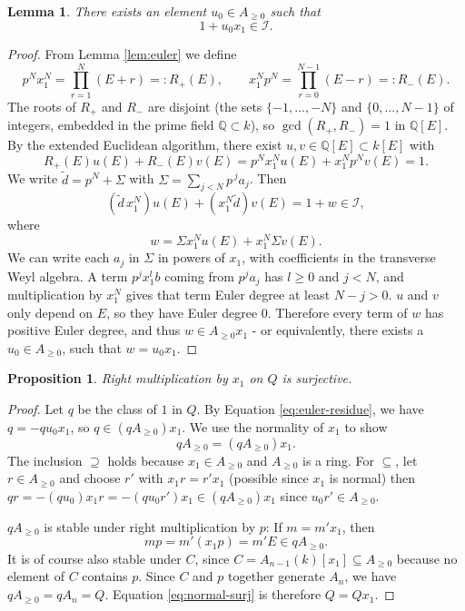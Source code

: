 \documentclass[pdflatex,sn-mathphys-num]{sn-jnl}
\numberwithin{equation}{section}
\theoremstyle{thmstyleone}
\newtheorem{proposition}[theorem]{Proposition}
\newtheorem{lemma}[theorem]{Lemma}
\theoremstyle{thmstyletwo}
\begin{document}
\begin{lemma}\label{lem:euler-residue}
There exists an element $u_0\in A_{\geq0}$ such that
\begin{equation} 1+u_0x_1\in \mathcal I.
 \label{eq:euler-residue}\end{equation}
\end{lemma}

\begin{proof}
From Lemma \ref{lem:euler} we define
\[p^Nx_1^N=\prod_{r=1}^N(E+r)=:R_+(E),\qquad
 x_1^Np^N=\prod_{r=0}^{N-1}(E-r)=:R_-(E).\]
The roots of $R_+$ and $R_-$ are disjoint (the sets $\{-1,\ldots,-N\}$ and $\{0,\ldots,N-1\}$ of integers, embedded in the prime field
$\mathbb Q\subset k$), so $\gcd(R_+,R_-)=1$ in $\mathbb Q[E]$. By the
extended Euclidean algorithm, there exist $u,v\in\mathbb Q[E]\subset
k[E]$ with
\[ R_+(E)u(E)+R_-(E)v(E)=p^Nx_1^Nu(E)+x_1^Np^Nv(E)=1.\]
We write $\tilde d=p^N+\Sigma$ with $\Sigma = \sum_{j<N}p^{\,j}a_j$. Then
\[(\tilde d\,x_1^N)u(E)+(x_1^N\tilde d)v(E)=1+w\in \mathcal I,\]
where
\[w=\Sigma x_1^Nu(E)+x_1^N\Sigma v(E).\]
We can write each $a_j$ in $\Sigma$ in powers of $x_1$, with coefficients in the transverse Weyl algebra. A term $p^jx_1^lb$ coming from $p^ja_j$ has $l\geq0$ and $j<N$, and multiplication by $x_1^N$ gives that term Euler degree at least $N-j>0$. $u$ and $v$ only depend on $E$, so they have Euler degree 0. Therefore every term of $w$ has positive Euler degree, and thus $w\in A_{\geq0}x_1$ - or equivalently, there exists a $u_0\in A_{\geq0}$, such that $w=u_0x_1$.
\end{proof}


\begin{proposition}\label{prop:x-surjective}
Right multiplication by $x_1$ on $Q$ is surjective.
\end{proposition}
\begin{proof}
Let $q$ be the class of $1$ in $Q$. By Equation \eqref{eq:euler-residue}, we have
$q=-qu_0x_1$, so $q\in(qA_{\geq0})x_1$. We use the normality of $x_1$ to show
\begin{equation} qA_{\geq0}=(qA_{\geq0})x_1.
 \label{eq:normal-surj}\end{equation}
The inclusion $\supseteq$ holds because $x_1\in A_{\geq0}$ and
$A_{\geq0}$ is a ring. For $\subseteq$, let $r\in A_{\geq0}$ and choose
$r'$ with $x_1r=r'x_1$ (possible since $x_1$ is normal) then $qr=-(qu_0)x_1r=-(qu_0r')x_1\in(qA_{\geq0})x_1$ since $u_0r'\in A_{\geq0}$.

$qA_{\geq0}$ is stable under right multiplication by $p$: If $m=m'x_1$, then
\[ mp=m'(x_1p)=m'E\in qA_{\geq0}.\]
It is of course also stable under $C$, since $C=A_{n-1}(k)[x_1]\subseteq A_{\ge0}$ because no element of $C$ contains $p$. Since $C$ and $p$ together generate $A_n$, we have $qA_{\geq0}=qA_n=Q$. Equation \eqref{eq:normal-surj} is therefore $Q=Qx_1$.
\end{proof}
\end{document}
